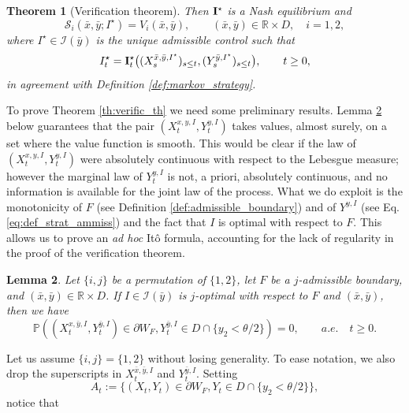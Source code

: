\documentclass[10pt]{article}
\numberwithin{equation}{section}
\theoremstyle{plain}
\newtheorem{theorem}{Theorem}
\numberwithin{theorem}{section}
\newtheorem{lemma}[theorem]{Lemma}                              %
\theoremstyle{definition}
\def \R {\mathbb{R}}
\def \p {\partial}
\newcommand{\<}{\langle}
\renewcommand{\>}{\rangle}
\renewcommand{\(}{\left(}
\renewcommand{\)}{\right)}
\newcommand\Pb{\mathbb{P}}
\newcommand\contr{{\bf I}}
\def \R  {{\mathbb {R}}}
\def \p {{\partial}}
\def \R {{\mathbb {R}}}
\def\cI{{\mathcal I}}
\def\cS{{\mathcal S}}
\begin{document}
{{{\begin{theorem}[Verification theorem]
Then $\contr^{\star}$ is a Nash equilibrium and 
\begin{equation}\label{eq:nash_cond_th}
\cS_i(\bar x,\bar y; I^{\star}) = V_i(\bar x,\bar y) , \qquad (\bar x,\bar y)\in \R\times D,\quad  i = 1,2,
\end{equation}
where $I^{\star}\in\mathcal{I}(\bar y)$ is the unique admissible control such that 
\begin{equation}\label{eq:I_markov_star}
I^{\star}_t = \contr_t^{\star}\big((X^{\bar x,\bar y,I^{\star}}_s)_{s\leq t}, (Y^{\bar y,I^{\star}}_{s})_{s\leq t}\big), \qquad t\geq 0, 
\end{equation}
in agreement with Definition \ref{def:markov_strategy}.
\end{theorem}
To prove Theorem \ref{th:verific_th} we need some preliminary results. Lemma \ref{lem:boundary} below guarantees that the pair $(X^{x,y,I}_t,Y^{y,I}_t)$ takes values, almost surely, on a set where the value function is smooth. This would be clear if the law of $(X^{x,y,I}_t,Y^{y,I}_t)$ were absolutely continuous with respect to the Lebesgue measure; however the marginal law of $Y^{y,I}_t$ is not, a priori, absolutely continuous, and no information is available for the joint law of the process. What we do exploit is the monotonicity of $F$ (see Definition \ref{def:admissible_boundary}) and of $Y^{y,I}$ (see Eq. \eqref{eq:def_strat_ammiss}) and the fact that $I$ is optimal with respect to $F$.
This allows us to prove an {\em ad hoc} It\^o formula, accounting for the lack of regularity in the proof of the verification theorem. 
\begin{lemma}\label{lem:boundary}
{Let $\{i,j\}$ be a permutation of $\{ 1,2 \}$, let $F$ be a $j$-admissible boundary, and $(\bar x, \bar y)\in \R\times {D}$.} 
If $I\in \cI(\bar y)$ is {$j$-optimal with respect to $F$ and $(\bar x, \bar y)$}, then we have
\begin{equation}\label{eq:boundary}
\Pb\left((X^{x,\bar y,I}_t,Y^{\bar y,I}_t)\in \p W_F , Y^{\bar y,I}_t \in D \cap \{y_2 < \theta/2 \} \right)=0, \qquad a.e. \quad t\geq 0.
\end{equation}
\end{lemma}
\proof Let us assume $\{i,j\} = \{1,2\}$ without losing generality. To ease notation, we also drop the superscripts in $X^{\bar x,\bar y,I}_t$ and $Y^{\bar y,I}_t$. Setting
\begin{equation}%
A_t := \big\{{(X_t,Y_t)\in  \p W_F, Y_t\in   D \cap \{y_2 < \theta/2 \} }\big\} ,
\end{equation}
notice that%
}}}
\end{document}
